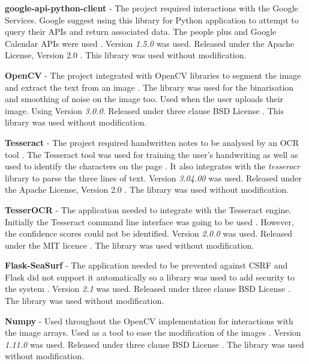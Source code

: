 \textbf{google-api-python-client} - The project required interactions with the Google Services. Google suggest using this library for Python application to attempt to query their APIs and return associated data. The people plus and Google Calendar APIs were used \cite{citeulike:14025877}. Version \textit{1.5.0} was used. Released under the Apache License, Version 2.0 \cite{apache_license}.  This library was used without modification.

\textbf{OpenCV} - The project integrated with OpenCV libraries to segment the image and extract the text from an image \cite{citeulike:13206865}. The library was used for the binarisation and smoothing of noise on the image too. Used when the user uploads their image. Using Version \textit{3.0.0}. Released under three clause BSD License \cite{citeulike:14025861}. This library was used without modification.

\textbf{Tesseract} - The project required handwritten notes to be analysed by an OCR tool . The Tesseract tool was used for training the user's handwriting as well as used to identify the characters on the page \cite{citeulike:14014368}. It also integrates with the \textit{tesserocr} library to parse the three lines of text. Version \textit{3.04.00} was used. Released under the Apache License, Version 2.0 \cite{apache_license}. The library was used without modification.

\textbf{TesserOCR} - The application needed to integrate with the Tesseract engine. Initially the Tesseract command line interface was going to be used \cite{citeulike:14021437}. However, the confidence scores could not be identified. Version \textit{2.0.0} was used. Released under the MIT licence \cite{citeulike:14025880}. The library was used without modification.

\textbf{Flask-SeaSurf} - The application needed to be prevented against CSRF and Flask did not support it automatically so a library was used to add security to the system \cite{citeulike:14025881}. Version \textit{2.1} was used. Released under three clause BSD License \cite{citeulike:14025861}. The library was used without modification.

\textbf{Numpy} - Used throughout the OpenCV implementation for interactions with the image arrays. Used as a tool to ease the modification of the images \cite{citeulike:14025883}. Version \textit{1.11.0} was used. Released under three clause BSD License \cite{citeulike:14025861}. The library was used without modification.

